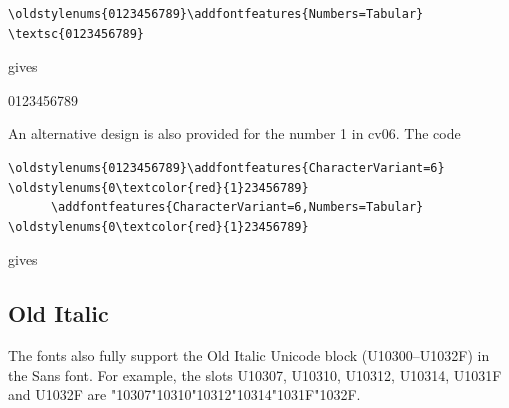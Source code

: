 \documentclass{article}
\begin{document}
\begin{verbatim}
\oldstylenums{0123456789}\addfontfeatures{Numbers=Tabular}
\textsc{0123456789}
\end{verbatim}
gives


\textsc{0123456789}

\medskip

\noindent An alternative design is also provided for the number 1 in cv06.
The code

\begin{verbatim}
\oldstylenums{0123456789}\addfontfeatures{CharacterVariant=6}
\oldstylenums{0\textcolor{red}{1}23456789}
      \addfontfeatures{CharacterVariant=6,Numbers=Tabular}
\oldstylenums{0\textcolor{red}{1}23456789}
\end{verbatim}
gives








\subsection{Old Italic}

The fonts also fully support the Old Italic Unicode block
(U10300--U1032F) in the Sans font. For example, the slots
U10307, U10310, U10312, U10314, U1031F and U1032F are
{\sffamily\char"10307\char"10310\char"10312\char"10314\char"1031F\char"1032F}.
\end{document}
